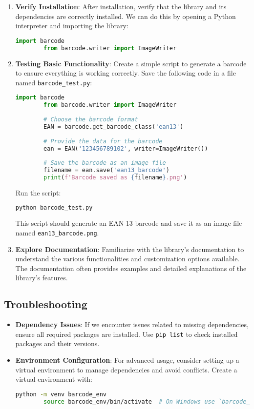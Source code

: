 \begin{enumerate}
	\item \textbf{Verify Installation}: After installation, verify that the library and its dependencies are correctly installed. We can do this by opening a Python interpreter and importing the library:
	\begin{lstlisting}[language=Python]
		import barcode
		from barcode.writer import ImageWriter
	\end{lstlisting}
	
	\item \textbf{Testing Basic Functionality}: Create a simple script to generate a barcode to ensure everything is working correctly. Save the following code in a file named \texttt{barcode\_test.py}:
	\begin{lstlisting}[language=Python]
		import barcode
		from barcode.writer import ImageWriter
		
		# Choose the barcode format
		EAN = barcode.get_barcode_class('ean13')
		
		# Provide the data for the barcode
		ean = EAN('123456789102', writer=ImageWriter())
		
		# Save the barcode as an image file
		filename = ean.save('ean13_barcode')
		print(f'Barcode saved as {filename}.png')
	\end{lstlisting}
	
	Run the script:
	\begin{lstlisting}[language=bash]
		python barcode_test.py
	\end{lstlisting}
	
	This script should generate an EAN-13 barcode and save it as an image file named \texttt{ean13\_barcode.png}.
	
	\item \textbf{Explore Documentation}: Familiarize with the library's documentation to understand the various functionalities and customization options available. The documentation often provides examples and detailed explanations of the library's features.
\end{enumerate}


\subsection*{Troubleshooting}

\begin{itemize}
	\item \textbf{Dependency Issues}: If we encounter issues related to missing dependencies, ensure all required packages are installed. Use \texttt{pip list} to check installed packages and their versions.
	
	\item \textbf{Environment Configuration}: For advanced usage, consider setting up a virtual environment to manage dependencies and avoid conflicts. Create a virtual environment with:
	\begin{lstlisting}[language=bash]
		python -m venv barcode_env
		source barcode_env/bin/activate  # On Windows use `barcode_env\Scripts\activate`
	\end{lstlisting}
	
\end{itemize}

